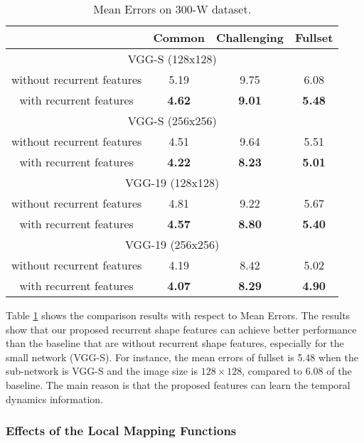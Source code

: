 \documentclass[journal]{IEEEtran}
\begin{document}
\begin{table}[h]
\small
    \centering \caption{Mean Errors on 300-W dataset.}
    \begin{tabular}{c|c c c}
      \hline
    & Common & Challenging & Fullset \\
        \hline
          \multicolumn{4}{c}{VGG-S (128x128)}\\
          \hline
         without recurrent features  & 5.19 & 9.75 & 6.08 \\
         with recurrent features  & \textbf{4.62} & \textbf{9.01} & \textbf{5.48} \\
         \hline
          \multicolumn{4}{c}{VGG-S (256x256)}\\
          \hline
       without recurrent features  & 4.51 & 9.64 & 5.51 \\
       with recurrent features  &\textbf{ 4.22} & \textbf{8.23} &\textbf{5.01} \\
        \hline
         \multicolumn{4}{c}{VGG-19 (128x128)}\\
          \hline
        without recurrent features & 4.81 & 9.22 & 5.67 \\
        with recurrent features &\textbf{ 4.57} &\textbf{8.80} & \textbf{5.40} \\
        \hline
          \multicolumn{4}{c}{VGG-19 (256x256)}\\
          \hline
        without recurrent features & 4.19 & 8.42 & 5.02\\
        with recurrent features &\textbf{ 4.07} & \textbf{8.29} & \textbf{4.90}\\
        \hline
        \end{tabular}
    \label{compare_rsf}
\end{table}

Table \ref{compare_rsf} shows the comparison results with respect to Mean Errors. The results show that our proposed recurrent shape features can achieve better performance than the baseline that are without recurrent shape features, especially for the small network (VGG-S). For instance, the mean errors of fullset is 5.48 when the sub-network is VGG-S and the image size is $128 \times 128$, compared to 6.08 of the baseline. The main reason is that the proposed features can learn the temporal dynamics information.

\subsubsection{Effects of the Local Mapping Functions} \label{Eff_LMF}
\end{document}
